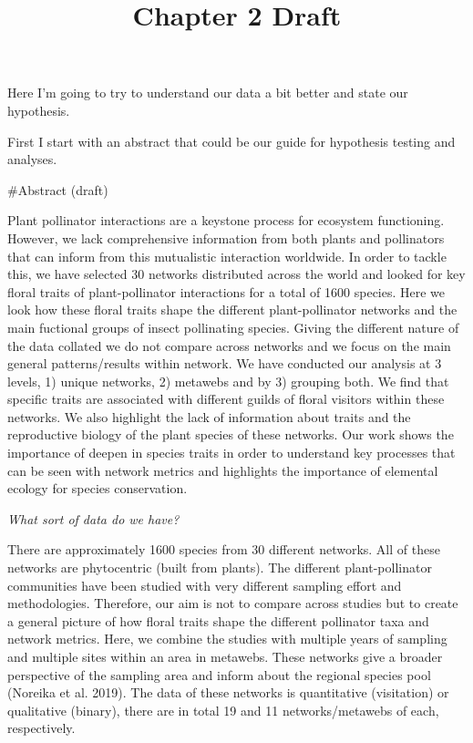 \documentclass[12pt,]{article}
\title{Chapter 2 Draft}
\author{}
\date{}
\begin{document}
\maketitle

Here I'm going to try to understand our data a bit better and state our
hypothesis.

First I start with an abstract that could be our guide for hypothesis
testing and analyses.

\#Abstract (draft)

Plant pollinator interactions are a keystone process for ecosystem
functioning. However, we lack comprehensive information from both plants
and pollinators that can inform from this mutualistic interaction
worldwide. In order to tackle this, we have selected 30 networks
distributed across the world and looked for key floral traits of
plant-pollinator interactions for a total of 1600 species. Here we look
how these floral traits shape the different plant-pollinator networks
and the main fuctional groups of insect pollinating species. Giving the
different nature of the data collated we do not compare across networks
and we focus on the main general patterns/results within network. We
have conducted our analysis at 3 levels, 1) unique networks, 2) metawebs
and by 3) grouping both. We find that specific traits are associated
with different guilds of floral visitors within these networks. We also
highlight the lack of information about traits and the reproductive
biology of the plant species of these networks. Our work shows the
importance of deepen in species traits in order to understand key
processes that can be seen with network metrics and highlights the
importance of elemental ecology for species conservation.

\emph{What sort of data do we have?}

There are approximately 1600 species from 30 different networks. All of
these networks are phytocentric (built from plants). The different
plant-pollinator communities have been studied with very different
sampling effort and methodologies. Therefore, our aim is not to compare
across studies but to create a general picture of how floral traits
shape the different pollinator taxa and network metrics. Here, we
combine the studies with multiple years of sampling and multiple sites
within an area in metawebs. These networks give a broader perspective of
the sampling area and inform about the regional species pool (Noreika et
al. 2019). The data of these networks is quantitative (visitation) or
qualitative (binary), there are in total 19 and 11 networks/metawebs of
each, respectively.
\end{document}
